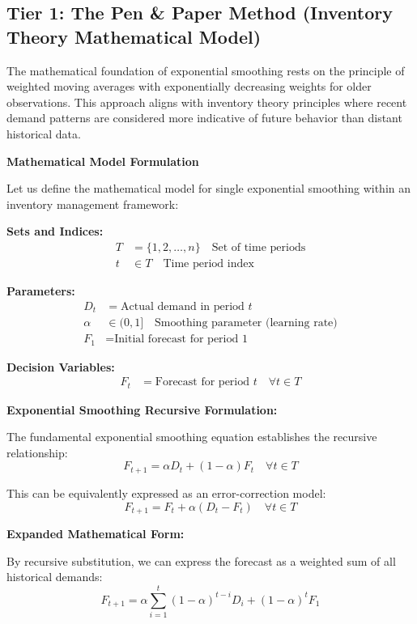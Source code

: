 \documentclass{article}
\begin{document}
\subsection{Tier 1: The Pen \& Paper Method (Inventory Theory Mathematical Model)}

The mathematical foundation of exponential smoothing rests on the principle of weighted moving averages with exponentially decreasing weights for older observations. This approach aligns with inventory theory principles where recent demand patterns are considered more indicative of future behavior than distant historical data.

\textbf{Mathematical Model Formulation}

Let us define the mathematical model for single exponential smoothing within an inventory management framework:

\textbf{Sets and Indices:}
\begin{align}
T &= \{1, 2, \ldots, n\} \quad \text{Set of time periods} \\
t &\in T \quad \text{Time period index}
\end{align}

\textbf{Parameters:}
\begin{align}
D_t &= \text{Actual demand in period } t \\
\alpha &\in (0,1] \quad \text{Smoothing parameter (learning rate)} \\
F_1 &= \text{Initial forecast for period 1}
\end{align}

\textbf{Decision Variables:}
\begin{align}
F_t &= \text{Forecast for period } t \quad \forall t \in T
\end{align}

\textbf{Exponential Smoothing Recursive Formulation:}

The fundamental exponential smoothing equation establishes the recursive relationship:
\begin{equation}
F_{t+1} = \alpha D_t + (1-\alpha)F_t \quad \forall t \in T
\end{equation}

This can be equivalently expressed as an error-correction model:
\begin{equation}
F_{t+1} = F_t + \alpha(D_t - F_t) \quad \forall t \in T
\end{equation}

\textbf{Expanded Mathematical Form:}

By recursive substitution, we can express the forecast as a weighted sum of all historical demands:
\begin{equation}
F_{t+1} = \alpha \sum_{i=1}^{t} (1-\alpha)^{t-i} D_i + (1-\alpha)^t F_1
\end{equation}
\end{document}
